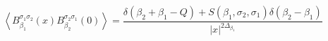 \begin{equation}
\left\langle
B_{\beta_1}^{\sigma_{1}\sigma_{2}}(x)B_{\beta_2}^{\sigma_{2}\sigma_{1}}(0)\right\rangle
=\frac{\delta(\beta_2+\beta_1-Q)+S(\beta_1,\sigma_{2},\sigma_{1})\delta(\beta_2-\beta_1)}{\left|
x\right|^{2\Delta_{\beta_1}}} \nonumber
\end{equation}

